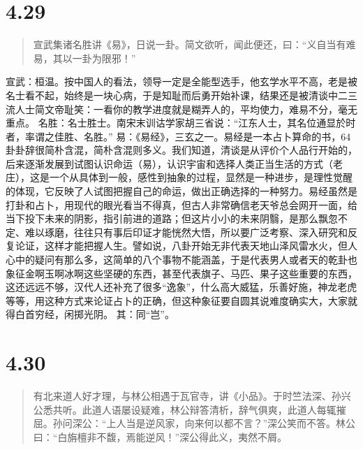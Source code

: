 \documentclass[]{book}
\begin{document}
\section{4.29}\label{section-207}

\begin{quote}
宣武集诸名胜讲《易》，日说一卦。简文欲听，闻此便还，曰：``义自当有难易，其以一卦为限邪！''
\end{quote}

宣武：桓温。按中国人的看法，领导一定是全能型选手，他玄学水平不高，老是被名士看不起，始终是一块心病，于是知耻而后勇开始补课，结果还是被清谈中二三流人士简文帝耻笑：一看你的教学进度就是糊弄人的，平均使力，难易不分，毫无重点。
名胜：名士胜士。南宋末训诂学家胡三省说：``江东人士，其名位通显於时者，率谓之佳胜、名胜。''
易：《易经》，三玄之一。易经是一本占卜算命的书，64卦卦辞很简朴含混，简朴含混则多义。我们知道，清谈是从评价个人品行开始的，后来逐渐发展到试图认识命运（易），认识宇宙和选择人类正当生活的方式（老庄），这是一个从具体到一般，感性到抽象的过程，显然是一种进步，是理性觉醒的体现，它反映了人试图把握自己的命运，做出正确选择的一种努力。易经虽然是打卦和占卜，用现代的眼光看当不得真，但古人非常确信老天爷总会网开一面，给当下投下未来的阴影，指引前进的道路；但这片小小的未来阴翳，是那么飘忽不定、难以琢磨，往往只有事后印证才能恍然大悟，所以要广泛考察、深入研究和反复论证，这样才能把握人生。譬如说，八卦开始无非代表天地山泽风雷水火，但人心中的疑问有那么多，这简单的八个事物不能涵盖，于是代表男人或者天的乾卦也象征金啊玉啊冰啊这些坚硬的东西，甚至代表旗子、马匹、果子这些重要的东西，这还远远不够，汉代人还补充了很多``逸象''，什么高大威猛，乐善好施，神龙老虎等等，用这种方式来论证占卜的正确，但这种象征要自圆其说难度确实大，大家就得白首穷经，闲掷光阴。
其：同``岂''。

\section{4.30}\label{section-208}

\begin{quote}
有北来道人好才理，与林公相遇于瓦官寺，讲《小品》。于时竺法深、孙兴公悉共听。此道人语屡设疑难，林公辩答清析，辞气俱爽，此道人每辄摧屈。孙问深公：``上人当是逆风家，向来何以都不言？''深公笑而不答。林公曰：``白旃檀非不馥，焉能逆风！''深公得此义，夷然不屑。
\end{quote}
\end{document}
